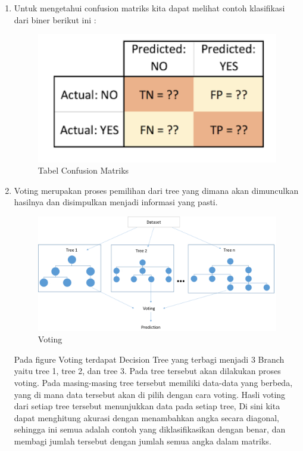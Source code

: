 \begin{enumerate}
\item Untuk mengetahui confusion matriks kita dapat melihat contoh klasifikasi dari biner berikut ini :
	\begin{figure}[ht]
	\centerline{\includegraphics[width=1\textwidth]{figures/andi/CM.PNG}}
	\caption{Tabel Confusion Matriks}
	\label{contoh}
	\end{figure}
\item Voting merupakan proses pemilihan dari tree yang dimana akan dimunculkan hasilnya dan disimpulkan menjadi informasi yang pasti.
	\begin{figure}[ht]
	\centerline{\includegraphics[width=1\textwidth]{figures/andi/Voting.PNG}}
	\caption{Voting}
	\label{Contoh Voting}
	\end{figure}

Pada figure Voting terdapat Decision Tree yang terbagi menjadi 3 Branch yaitu tree 1, tree 2, dan tree 3. Pada tree tersebut akan dilakukan proses voting. Pada  masing-masing tree tersebut memiliki data-data yang berbeda, yang di mana data tersebut akan di pilih dengan cara voting. Hasli voting dari setiap tree tersebut menunjukkan data pada setiap tree, Di sini kita dapat menghitung akurasi dengan menambahkan angka secara diagonal, sehingga ini semua adalah contoh yang diklasifikasikan dengan benar, dan membagi jumlah tersebut dengan jumlah semua angka dalam matriks.

\end{enumerate}